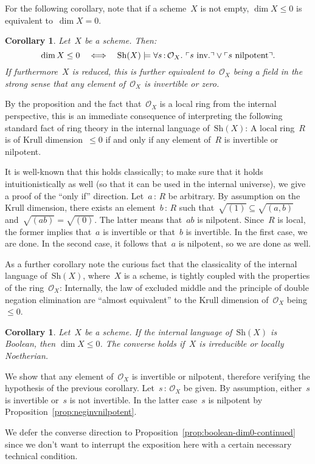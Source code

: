 \documentclass[10pt,reqno,a4paper]{amsbook}
\makeatletter
\theoremstyle{definition}
\theoremstyle{plain}
\newtheorem{cor}[defn]{Corollary}
\theoremstyle{remark}
\renewcommand{\O}{\mathcal{O}}
\newcommand{\Sh}{\mathrm{Sh}}
\newcommand{\?}{\,{:}\,}
\renewcommand{\_}{\mathpunct{.}\,}
\newcommand{\speak}[1]{\ulcorner\text{\textnormal{#1}}\urcorner}
\newcommand{\inv}{inv.\@}
\renewenvironment{proof}[1][\proofname]{\par
  \pushQED{\qed}%
  \normalfont \topsep6\p@\@plus6\p@\relax
  \trivlist
  \item[\hskip\labelsep
        \itshape
    #1\@addpunct{.}]\ignorespaces
}{%
  \popQED\endtrivlist\@endpefalse
}
\makeatother
\begin{document}
For the following corollary, note that if a scheme~$X$ is not empty, $\dim X
\leq 0$ is equivalent to~$\dim X = 0$.
\begin{cor}\label{cor:scheme-dimension-zero}
Let~$X$ be a scheme. Then:
\[ \dim X \leq 0 \quad\Longleftrightarrow\quad
  \Sh(X) \models \forall s\?\O_X\_ \speak{$s$ \inv} \vee \speak{$s$ nilpotent}.
  \]
If furthermore~$X$ is reduced, this is further equivalent to~$\O_X$ being a
field in the strong sense that any element of~$\O_X$ is invertible or zero.
\end{cor}
\begin{proof}By the proposition and the fact that~$\O_X$ is a local ring from
the internal perspective, this is an immediate consequence of
interpreting the following standard fact of ring theory in the internal
language of~$\Sh(X)$: A local ring~$R$ is of Krull
dimension~$\leq 0$ if and only if any element of~$R$ is invertible or
nilpotent.

It is well-known that this holds classically; to make sure that it
holds intuitionistically as well (so that it can be used in the internal
universe), we give a proof of the ``only if'' direction. Let~$a \? R$ be
arbitrary. By assumption on the Krull dimension, there exists an element~$b \?
R$ such that~$\sqrt{(1)} \subseteq \sqrt{(a,b)}$ and~$\sqrt{(ab)} =
\sqrt{(0)}$. The latter means that~$ab$ is nilpotent. Since~$R$ is local, the
former implies that~$a$ is invertible or that~$b$ is invertible. In the first
case, we are done. In the second case, it follows that~$a$ is nilpotent, so we
are done as well.
\end{proof}

As a further corollary note the curious fact that the classicality of the
internal language of~$\Sh(X)$, where~$X$ is a scheme, is tightly coupled with
the properties of the ring~$\O_X$: Internally, the law of excluded middle and
the principle of double negation elimination are ``almost equivalent'' to the
Krull dimension of~$\O_X$ being~$\leq 0$.
\begin{cor}\label{cor:boolean-dim0}
Let~$X$ be a scheme. If the internal language of~$\Sh(X)$ is Boolean, then
$\dim X \leq 0$. The converse holds if~$X$ is irreducible or locally Noetherian.
\end{cor}
\begin{proof}
We show that any element of~$\O_X$ is invertible or nilpotent, therefore
verifying the hypothesis of the previous corollary.
Let~$s\?\O_X$ be given. By assumption, either~$s$ is invertible or~$s$ is not
invertible. In the latter case~$s$ is nilpotent by
Proposition~\ref{prop:neginvnilpotent}.

We defer the converse direction to
Proposition~\ref{prop:boolean-dim0-continued} since we don't want to interrupt
the exposition here with a certain necessary technical condition.
\end{proof}
\end{document}
